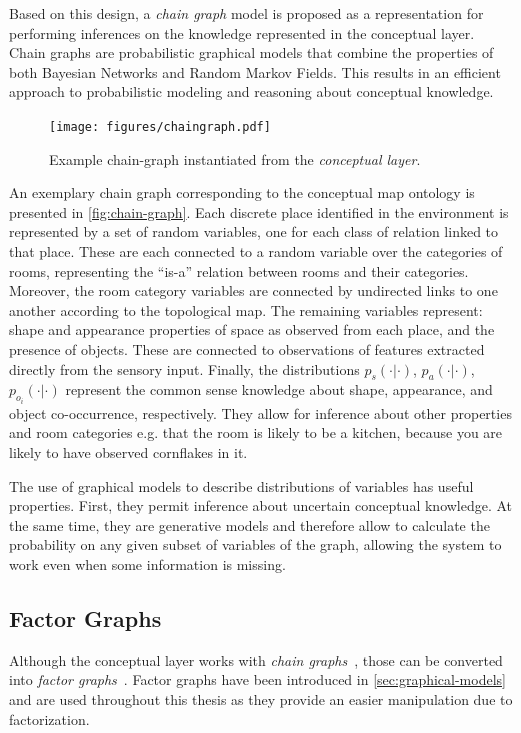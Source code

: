 Based on this design, a \emph{chain graph} model is proposed as a 
representation for performing inferences on the knowledge represented in the conceptual 
layer. Chain graphs are probabilistic graphical models that combine the properties of 
both Bayesian Networks and Random Markov Fields. This results in an efficient approach to 
probabilistic modeling and reasoning about conceptual knowledge.

\begin{figure}[h]
\centering
\texttt{[image: figures/chaingraph.pdf]}
\caption{\label{fig:chain-graph}Example chain-graph instantiated from the \emph{conceptual layer}.}
\end{figure}

An exemplary chain graph corresponding to the conceptual map ontology is presented
in \autoref{fig:chain-graph}. 
Each discrete place identified in the environment is represented by a set of random variables, 
one for each class of relation linked to that place. These are each connected to a random variable
over the categories of rooms, representing the ``is-a'' relation between rooms and their categories. 
Moreover, the room category variables are connected by undirected links to one another according 
to the topological map. The remaining variables represent: shape and appearance properties of space 
as observed from each place, and the presence of objects. 
These are connected to observations of features extracted directly from 
the sensory input. Finally, the 
distributions $p_{s}(\cdot|\cdot)$, $p_a(\cdot|\cdot)$, $p_{o_i}(\cdot|\cdot)$ 
represent the common sense knowledge about shape, appearance, and object co-occurrence, respectively. 
They allow for inference about other properties and room categories e.g. that the room is likely to be a kitchen,
because you are likely to have observed cornflakes in it. 

The use of graphical models to describe distributions of variables has useful properties.
First, they permit inference about uncertain conceptual knowledge. At the same time, they are 
generative models and therefore allow to calculate the probability
on any given subset of variables of the graph, allowing the system to work even when some
information is missing.

\subsection{Factor Graphs}
Although the conceptual layer works with \emph{chain graphs}~\cite{lauritzen2002chain},
those can be converted into \emph{factor graphs}~\cite{kschischang2001factor}.
Factor graphs have been introduced in \autoref{sec:graphical-models} and are used
throughout this thesis as they provide an easier manipulation due to factorization.

